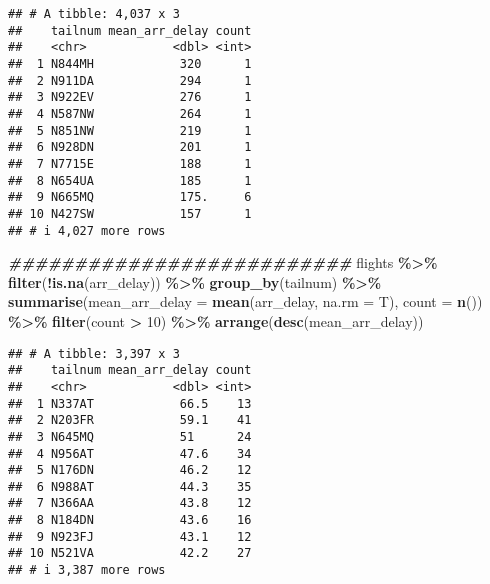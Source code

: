 \documentclass[
]{article}
\newenvironment{Shaded}{\begin{snugshade}}{\end{snugshade}}
\newcommand{\AttributeTok}[1]{\textcolor[rgb]{0.13,0.29,0.53}{#1}}
\newcommand{\DecValTok}[1]{\textcolor[rgb]{0.00,0.00,0.81}{#1}}
\newcommand{\DocumentationTok}[1]{\textcolor[rgb]{0.56,0.35,0.01}{\textbf{\textit{#1}}}}
\newcommand{\FunctionTok}[1]{\textcolor[rgb]{0.13,0.29,0.53}{\textbf{#1}}}
\newcommand{\NormalTok}[1]{#1}
\newcommand{\SpecialCharTok}[1]{\textcolor[rgb]{0.81,0.36,0.00}{\textbf{#1}}}
\begin{document}
\begin{verbatim}
## # A tibble: 4,037 x 3
##    tailnum mean_arr_delay count
##    <chr>            <dbl> <int>
##  1 N844MH            320      1
##  2 N911DA            294      1
##  3 N922EV            276      1
##  4 N587NW            264      1
##  5 N851NW            219      1
##  6 N928DN            201      1
##  7 N7715E            188      1
##  8 N654UA            185      1
##  9 N665MQ            175.     6
## 10 N427SW            157      1
## # i 4,027 more rows
\end{verbatim}

\begin{Shaded}
\begin{Highlighting}[]
\DocumentationTok{\#\#\#\#\#\#\#\#\#\#\#\#\#\#\#\#\#\#\#\#\#\#\#\#\#\#}
\NormalTok{flights }\SpecialCharTok{\%\textgreater{}\%}
  \FunctionTok{filter}\NormalTok{(}\SpecialCharTok{!}\FunctionTok{is.na}\NormalTok{(arr\_delay)) }\SpecialCharTok{\%\textgreater{}\%}
  \FunctionTok{group\_by}\NormalTok{(tailnum) }\SpecialCharTok{\%\textgreater{}\%}
  \FunctionTok{summarise}\NormalTok{(}\AttributeTok{mean\_arr\_delay =} \FunctionTok{mean}\NormalTok{(arr\_delay, }\AttributeTok{na.rm =}\NormalTok{ T),}
            \AttributeTok{count =} \FunctionTok{n}\NormalTok{()) }\SpecialCharTok{\%\textgreater{}\%}
  \FunctionTok{filter}\NormalTok{(count }\SpecialCharTok{\textgreater{}} \DecValTok{10}\NormalTok{) }\SpecialCharTok{\%\textgreater{}\%}
  \FunctionTok{arrange}\NormalTok{(}\FunctionTok{desc}\NormalTok{(mean\_arr\_delay))}
\end{Highlighting}
\end{Shaded}

\begin{verbatim}
## # A tibble: 3,397 x 3
##    tailnum mean_arr_delay count
##    <chr>            <dbl> <int>
##  1 N337AT            66.5    13
##  2 N203FR            59.1    41
##  3 N645MQ            51      24
##  4 N956AT            47.6    34
##  5 N176DN            46.2    12
##  6 N988AT            44.3    35
##  7 N366AA            43.8    12
##  8 N184DN            43.6    16
##  9 N923FJ            43.1    12
## 10 N521VA            42.2    27
## # i 3,387 more rows
\end{verbatim}
\end{document}
